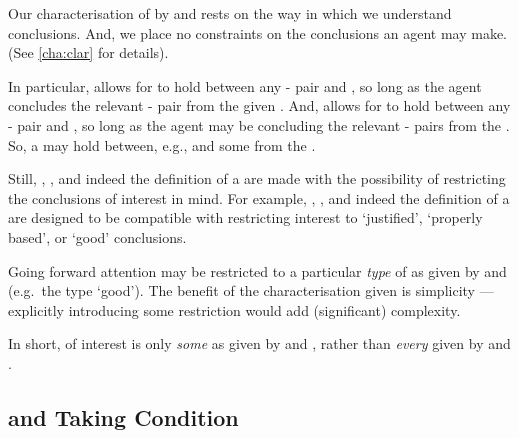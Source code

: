 \begin{note}
  Our characterisation of \ros{} by \supportI{} and \supportII{} rests on the way in which we understand conclusions.
  And, we place no constraints on the conclusions an agent may make.
  (See \autoref{cha:clar} for details).

  In particular, \supportI{} allows for \ros{} to hold between any - pair and , so long as the agent concludes the relevant - pair from the given \pool{}.
  And, \supportII{} allows for \ros{} to hold between any - pair and , so long as the agent may be concluding the relevant - pairs from the \pool{}.
  So, a \ros{} may hold between, e.g.,  and some \pool{} from the \agpe{}.

  Still, \supportI{}, \supportII{}, and indeed the definition of a \fc{} are made with the possibility of restricting the conclusions of interest in mind.
  For example, \supportI{}, \supportII{}, and indeed the definition of a \fc{} are designed to be compatible with restricting interest to `justified', `properly based', or `good' conclusions.

  Going forward attention may be restricted to a particular \emph{type} of \ros{} as given by \supportI{} and \supportII{} (e.g.\ the type `good').
  The benefit of the characterisation given is simplicity --- explicitly introducing some restriction would add (significant) complexity.

  In short, of interest is only \emph{some}  as given by \supportI{} and \supportII{}, rather than \emph{every} \ros{} given by \supportI{} and \supportII{}.
\end{note}




\subsection*{\supportI{} and \citeauthor{Boghossian:2014aa} Taking Condition}


